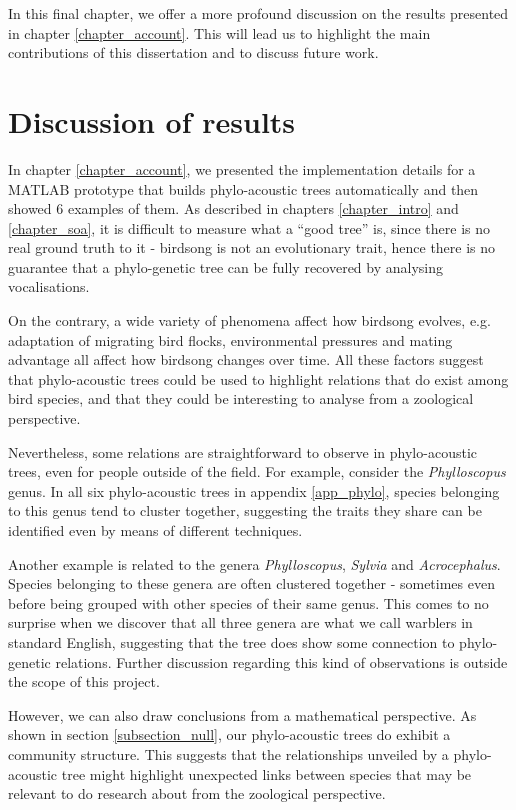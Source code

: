 \documentclass[../main.tex]{subfiles}
\begin{document}
 \label{chapter_conclusion}
In this final chapter, we offer a more profound discussion on the results presented in chapter \ref{chapter_account}. This will lead us to highlight the main contributions of this dissertation and to discuss future work.

\section{Discussion of results}
In chapter \ref{chapter_account}, we presented the implementation details for a MATLAB prototype that builds phylo-acoustic trees automatically and then showed 6 examples of them. As described in chapters \ref{chapter_intro} and \ref{chapter_soa}, it is difficult to measure what a ``good tree'' is, since there is no real ground truth to it - birdsong is not an evolutionary trait, hence there is no guarantee that a phylo-genetic tree can be fully recovered by analysing vocalisations. 
\par On the contrary, a wide variety of phenomena affect how birdsong evolves, e.g. adaptation of migrating bird flocks, environmental pressures and mating advantage all affect how birdsong changes over time. All these factors suggest that phylo-acoustic trees could be used to highlight relations that do exist among bird species, and that they could be interesting to analyse from a zoological perspective.
\par Nevertheless, some relations are straightforward to observe in phylo-acoustic trees, even for people outside of the field. For example, consider the \emph{Phylloscopus} genus. In all six phylo-acoustic trees in appendix \ref{app_phylo}, species belonging to this genus tend to cluster together, suggesting the traits they share can be identified even by means of different techniques.
\par Another example is related to the genera \emph{Phylloscopus}, \emph{Sylvia} and \emph{Acrocephalus}. Species belonging to these genera are often clustered together - sometimes even before being grouped with other species of their same genus. This comes to no surprise when we discover that all three genera are what we call warblers in standard English, suggesting that the tree does show some connection to phylo-genetic relations. Further discussion regarding this kind of observations is outside the scope of this project.
\par However, we can also draw conclusions from a mathematical perspective. As shown in section \ref{subsection_null}, our phylo-acoustic trees do exhibit a community structure. This suggests that the relationships unveiled by a phylo-acoustic tree might highlight unexpected links between species that may be relevant to do research about from the zoological perspective.
\end{document}
